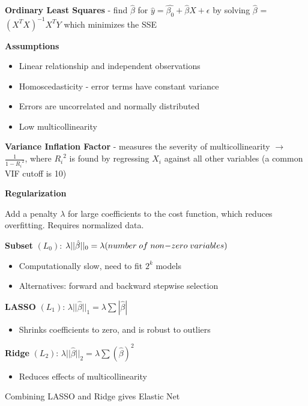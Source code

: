 \documentclass[10pt,landscape]{article}
\begin{document}
\begin{multicols}{3}
    \textbf{Ordinary Least Squares} - find $\hat{\beta}$ for $\hat{y} = \hat{\beta_{0}} + \hat{\beta}X + \epsilon$
    by solving $\hat{\beta}$ = $(X^{T}X)^{-1}X^{T}Y$ which minimizes the SSE

    \textbf{Assumptions}
    \begin{itemize}[label={--},leftmargin=4mm]
        \vspace{-1mm}
        \itemsep -.4mm
        \item Linear relationship and independent observations
        \item Homoscedasticity - error terms have constant variance
        \item Errors are uncorrelated and normally distributed
        \item Low multicollinearity
    \end{itemize}

    \textbf{Variance Inflation Factor} - measures the severity of multicollinearity $\to$ $\frac{1}{1-{R_i}^2}$, where ${R_i}^2$ is found by regressing $X_i$ against all other variables (a common VIF cutoff is 10)

    \textbf{Regularization}

    Add a penalty $\lambda$ for large coefficients to the cost function, which reduces overfitting. Requires normalized data.

    \textbf{Subset}  $(L_0)$: $\lambda ||\hat{\beta}||_0 = \lambda (number \;of\;non\hspace{-.7mm}-\hspace{-.7mm}zero\; variables)$
    \begin{itemize}[label={--},leftmargin=4mm]
        \vspace{-1mm}
        \itemsep -.4mm
        \item Computationally slow, need to fit $2^k$ models
        \item Alternatives: forward and backward stepwise selection
    \end{itemize}
    \textbf{LASSO} $(L_1)$: $\lambda ||\hat{\beta}||_1 = \lambda\sum | \hat{\beta} |$
    \begin{itemize}[label={--},leftmargin=4mm]
        \vspace{-1mm}
        \itemsep -.4mm
        \item Shrinks coefficients to zero, and is robust to outliers
    \end{itemize}
    \textbf{Ridge}  $(L_2)$: $\lambda ||\hat{\beta}||_2 = \lambda\sum( \hat{\beta})^2$
    \begin{itemize}[label={--},leftmargin=4mm]
        \vspace{-1mm}
        \itemsep -.4mm
        \item Reduces effects of multicollinearity
    \end{itemize}
    Combining LASSO and Ridge gives Elastic Net\\


\end{multicols}
\end{document}
